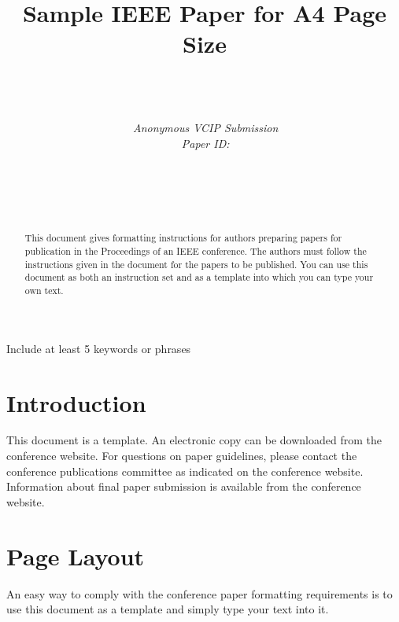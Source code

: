 \documentclass[10pt,conference,a4paper]{IEEEtran}
\title{Sample IEEE Paper for A4 Page Size}
\author{%
{}
\vspace{1.6mm}\\
\fontsize{10}{10}\selectfont\itshape
\,\\ 
\\
\fontsize{9}{9}\selectfont\ttfamily\upshape
%
\,Anonymous VCIP Submission\\
\,Paper ID:

\vspace{1.2mm}\\
\fontsize{10}{10}\selectfont\rmfamily\itshape
\,\\ 
\\

\fontsize{9}{9}\selectfont\ttfamily\upshape
\,
}
\begin{document}
\maketitle

\begin{figure}[b]
\parbox{\hsize}{\em

}\end{figure}


\begin{abstract}
This document gives formatting instructions for
authors preparing papers for publication in the Proceedings of
an IEEE conference. The authors must follow the instructions
given in the document for the papers to be published. You can
use this document as both an instruction set and as a template
into which you can type your own text.
\\[1\baselineskip]
\end{abstract}


\begin{keywords}
Include at least 5 keywords or phrases
\end{keywords}
%


\section{Introduction}
%
This document is a template.  An electronic copy can be downloaded
from the conference website.  For questions on paper guidelines,
please contact the conference publications committee as indicated on
the conference website.  Information about final paper submission is
available from the conference website.

\section{Page Layout}

An easy way to comply with the conference paper formatting
requirements is to use this document as a template and simply type
your text into it.
\end{document}
